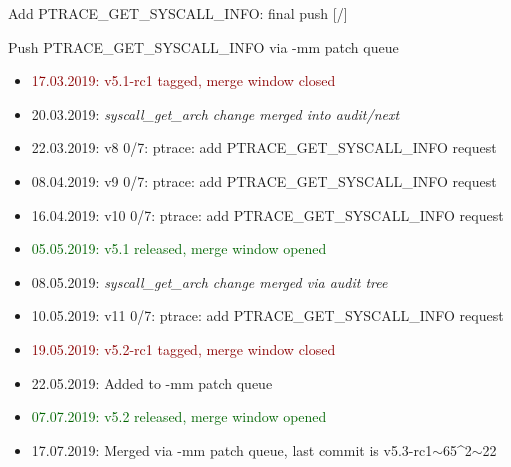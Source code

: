 \documentclass[unicode,aspectratio=169,xcolor={table,dvipsnames,usernames}]{beamer}
\begin{document}
\begin{frame}{Add PTRACE\_GET\_SYSCALL\_INFO: final push \hfill [\insertframenumber/\inserttotalframenumber]}
\begin{block}{\Large Push PTRACE\_GET\_SYSCALL\_INFO via -mm patch queue}
\begin{itemize}
	\item \textcolor{darkred}{17.03.2019: v5.1-rc1 tagged, merge window closed}
	\item 20.03.2019: \textit{syscall\_get\_arch change merged into audit/next}
	\item 22.03.2019: v8 0/7: ptrace: add PTRACE\_GET\_SYSCALL\_INFO request
	\item 08.04.2019: v9 0/7: ptrace: add PTRACE\_GET\_SYSCALL\_INFO request
	\item 16.04.2019: v10 0/7: ptrace: add PTRACE\_GET\_SYSCALL\_INFO request
	\item \textcolor{darkgreen}{05.05.2019: v5.1 released, merge window opened}
	\item 08.05.2019: \textit{syscall\_get\_arch change merged via audit tree}
	\item 10.05.2019: v11 0/7: ptrace: add PTRACE\_GET\_SYSCALL\_INFO request
	\item \textcolor{darkred}{19.05.2019: v5.2-rc1 tagged, merge window closed}
	\item 22.05.2019: Added to -mm patch queue
	\item \textcolor{darkgreen}{07.07.2019: v5.2 released, merge window opened}
	\item 17.07.2019: Merged via -mm patch queue, last commit is v5.3-rc1$\sim$65{\textasciicircum}2$\sim$22
\end{itemize}
\end{block}
\end{frame}
\end{document}
